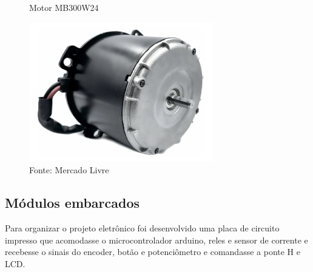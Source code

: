 \documentclass[../poliXuniversity_hospital_(USP)_report.tex]{subfiles}
\begin{document}
\begin{figure}[h]
\centering
    \caption{Motor MB300W24}
    \centering %
    \includegraphics[width=8cm]{images/MB200W24.jpg}
    \caption*{Fonte: Mercado Livre}
    \label{figura: MB300W24}
\end{figure}

\subsection{Módulos embarcados}
Para organizar o projeto eletrônico foi desenvolvido uma placa de circuito impresso que acomodasse o microcontrolador arduino, reles e sensor de corrente e recebesse o sinais do encoder, botão e potenciômetro e comandasse a ponte H e LCD.
\end{document}
